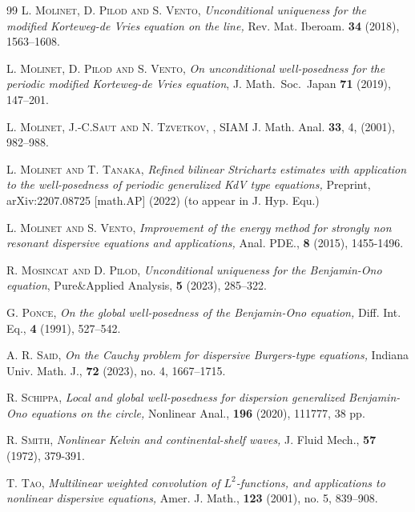 \documentclass{amsart}
\theoremstyle{definition}
\theoremstyle{remark}
\numberwithin{equation}{section}
\begin{document}
\begin{thebibliography}{99}
\newblock \textsc{L. Molinet, D. Pilod and S. Vento,}
\newblock \textit{Unconditional uniqueness for the modified {Korteweg}-de {Vries} equation on the line,}
\newblock Rev. Mat. Iberoam. \textbf{34} (2018), 1563--1608.

 \textsc{L. Molinet, D. Pilod and S. Vento}, \textit{On unconditional well-posedness for the periodic modified Korteweg-de Vries equation}, J. Math.\ Soc.\ Japan \textbf{71} (2019), 147--201.


\newblock \textsc{L. Molinet,  J.-C.Saut and N. Tzvetkov},
,
\newblock SIAM J. Math. Anal. {\bf 33}, 4, (2001), 982--988.

      
\newblock \textsc{L. Molinet and T. Tanaka,}
\newblock \textit{Refined bilinear Strichartz estimates with application to the well-posedness of periodic generalized KdV type equations,}
\newblock Preprint, arXiv:2207.08725 [math.AP] (2022) (to appear in J. Hyp. Equ.)

\newblock \textsc{L. Molinet and S. Vento,}
\newblock \emph{Improvement of the energy method for strongly non resonant dispersive equations and applications,}
\newblock Anal. PDE., \textbf{8} (2015), 1455-1496.

\newblock \textsc{R. Mosincat and D. Pilod,}
\newblock \emph{Unconditional uniqueness for the Benjamin-Ono equation}, 
\newblock Pure$\&$Applied Analysis, {\bf 5} (2023), 285--322.


\newblock \textsc{G. Ponce,}
\newblock \emph{On the global well-posedness of the Benjamin-Ono equation,}
\newblock Diff. Int. Eq., \textbf{4} (1991), 527--542.

\newblock \textsc{A. R. Said,}
\newblock \emph{On the Cauchy problem for dispersive Burgers-type equations,}
\newblock Indiana Univ. Math. J., {\bf 72} (2023), no. 4, 1667--1715.

\newblock \textsc{R. Schippa,}
\newblock \emph{Local and global well-posedness for dispersion generalized Benjamin-Ono equations on the circle,}
\newblock Nonlinear Anal., {\bf 196} (2020), 111777, 38 pp.

\newblock \textsc{R. Smith,}
\newblock \emph{Nonlinear Kelvin and continental-shelf waves,}
\newblock J. Fluid Mech., {\bf 57} (1972), 379-391.

\newblock \textsc{T. Tao,}
\newblock \emph{Multilinear weighted convolution of $L^2$-functions, and applications to nonlinear dispersive equations,}
\newblock Amer. J. Math., \textbf{123} (2001), no. 5, 839--908.




\end{thebibliography}
\end{document}
